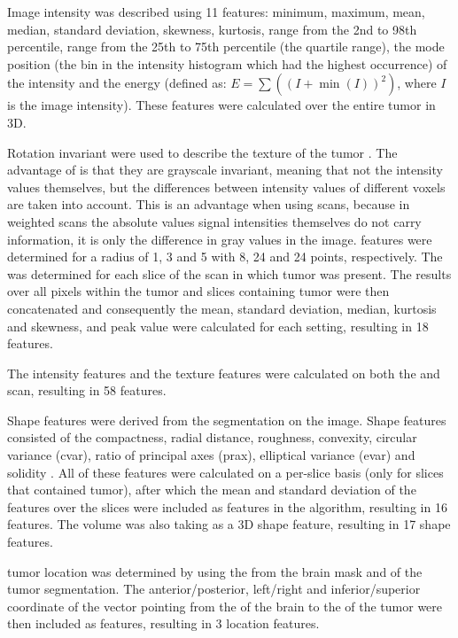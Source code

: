 \begin{subappendices}
Image intensity was described using 11 features: minimum, maximum, mean, median, standard deviation, skewness, kurtosis, range from the 2nd to 98th percentile, range from the 25th to 75th percentile (the quartile range), the mode position (the bin in the intensity histogram which had the highest occurrence) of the intensity and the energy (defined as: $E = \sum \left( {\left( I + \min(I)\right)}^2\right)$, where $I$ is the image intensity).
These features were calculated over the entire \gls{tumor} in 3D.

Rotation invariant  were used to describe the texture of the \gls{tumor} \autocite{ojala2002multiresolution}.
The advantage of  is that they are grayscale invariant, meaning that not the intensity values themselves, but the differences between intensity values of different voxels are taken into account.
This is an advantage when using  scans, because in weighted  scans the absolute values signal intensities themselves do not carry information, it is only the difference in gray values in the image.
 features were determined for a radius of 1, 3 and 5 with 8, 24 and 24 points, respectively.
The  was determined for each slice of the  scan in which \gls{tumor} was present.
The results over all pixels within the \gls{tumor} and slices containing \gls{tumor} were then concatenated and consequently the mean, standard deviation, median, kurtosis and skewness, and peak value were calculated for each setting, resulting in 18  features.

The intensity features and the texture features were calculated on both the  and  scan, resulting in 58 features.

Shape features were derived from the segmentation on the  image.
Shape features consisted of the compactness, radial distance, roughness, convexity, circular variance (cvar), ratio of principal axes (prax), elliptical variance (evar) and solidity \autocite{peura1997efficiency, xu2012comprehensive}.
All of these features were calculated on a per-slice basis (only for slices that contained \gls{tumor}), after which the mean and standard deviation of the features over the slices were included as features in the algorithm, resulting in 16 features.
The volume was also taking as a 3D shape feature, resulting in 17 shape features.

\Gls{tumor} location was determined by using the  from the brain mask and  of the \gls{tumor} segmentation.
The anterior/posterior, left/right and inferior/superior coordinate of the vector pointing from the  of the brain to the  of the \gls{tumor} were then included as features, resulting in 3 location features.


\end{subappendices}
